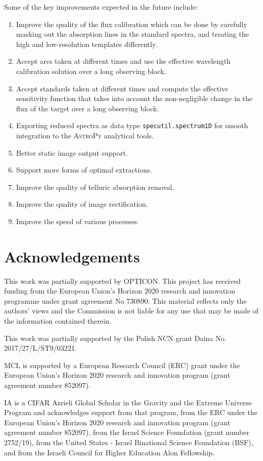 \documentclass[linenumbers, twocolumn]{aastex631}
\begin{document}
Some of the key improvements expected in the future include:
\begin{enumerate}
    \item Improve the quality of the flux calibration which can be done by
    carefully masking out the absorption lines in the standard spectra, and
    treating the high and low-resolution templates differently.
    \item Accept arcs taken at different times and use the effective wavelength
    calibration solution over a long observing block.
    \item Accept standards taken at different times and compute the effective
    sensitivity function that takes into account the non-negligible change
    in the flux of the target over a long observing block.
    \item Exporting reduced spectra as data type \texttt{specutil.spectrum1D}
    for smooth integration to the \textsc{AstroPy} analytical tools.
    \item Better static image output support.
    \item Support more forms of optimal extractions.
    \item Improve the quality of telluric absorption removal.
    \item Improve the quality of image rectification.
    \item Improve the speed of various processes.
\end{enumerate}


\section*{Acknowledgements}
This work was partially supported by OPTICON. This project has
received funding from the European Union's Horizon 2020 research and
innovation programme under grant agreement No 730890. This material
reflects only the authors' views and the Commission is not liable for
any use that may be made of the information contained therein.

This work was partially supported by the Polish NCN grant Daina
No. 2017/27/L/ST9/03221.

MCL is supported by a European Research Council (ERC) grant under the European Union's Horizon 2020 research and innovation program (grant agreement number 852097).

IA is a CIFAR Azrieli Global Scholar in the Gravity and the Extreme Universe Program and acknowledges support from that program, from the ERC under the European Union's Horizon 2020 research and innovation program (grant agreement number 852097), from the Israel Science Foundation (grant number 2752/19), from the United States - Israel Binational Science Foundation (BSF), and from the Israeli Council for Higher Education Alon Fellowship.
\end{document}
